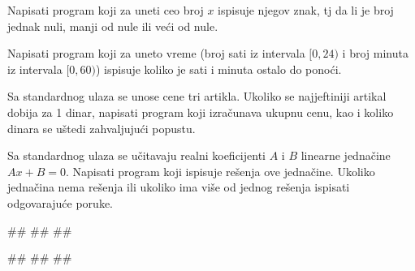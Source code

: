 \begin{Exercise}[label=v1.2_03] 
Napisati program koji za uneti ceo broj $x$ ispisuje njegov znak, tj da li je broj jednak nuli, manji od nule ili veći od nule.
\end{Exercise}
\begin{Answer}[ref=v1.2_03]
\end{Answer}



\begin{Exercise}[label=v1.2_01] 
Napisati program koji za uneto vreme (broj sati iz intervala $[0,24)$ i broj minuta iz intervala $[0,60)$) ispisuje koliko je sati i minuta ostalo do ponoći. 
\end{Exercise}
\begin{Answer}[ref=v1.2_01]
\end{Answer}



\begin{Exercise}[label=v1.2_06] 
Sa standardnog ulaza se unose cene tri artikla. Ukoliko se najjeftiniji
  artikal dobija za 1 dinar, napisati program koji izračunava ukupnu cenu, kao i koliko
  dinara se uštedi zahvaljujući popustu.  
\end{Exercise}
\begin{Answer}[ref=v1.2_06]
\end{Answer}

\begin{Exercise}[label=p1.2_10] 
 Sa standardnog ulaza se učitavaju realni koeficijenti $A$ i $B$ linearne jednačine $Ax+B = 0$. Napisati program koji ispisuje rešenja ove jednačine. Ukoliko jednačina nema rešenja ili ukoliko ima više od jednog rešenja ispisati odgovarajuće poruke.
 
\begin{miditest}
\begin{upotreba}{1}
#\naslovInt#
##
##
\end{upotreba}
\end{miditest}
\begin{miditest}
\begin{upotreba}{2}
#\naslovInt#
##
##
\end{upotreba}
\end{miditest}
\end{Exercise}
\begin{Answer}[ref=p1.2_10]
\end{Answer}

